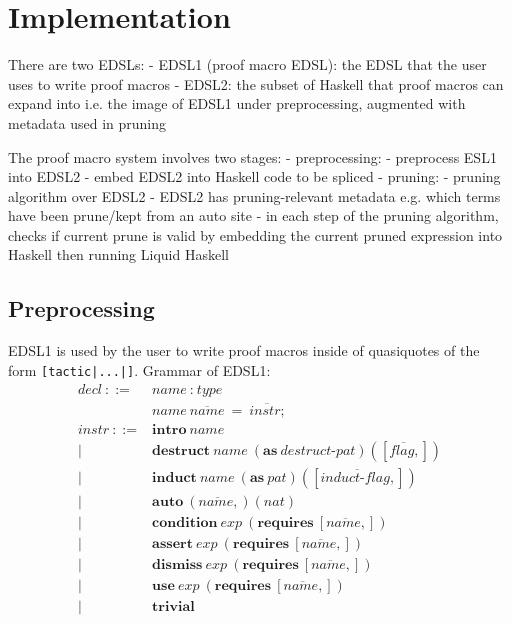 \section{Implementation}

There are two EDSLs:
- EDSL1 (proof macro EDSL): the EDSL that the user uses to write proof macros
- EDSL2: the subset of Haskell that proof macros can expand into i.e. the image of EDSL1 under preprocessing, augmented with metadata used in pruning

The proof macro system involves two stages:
- preprocessing:
  - preprocess ESL1 into EDSL2
  - embed EDSL2 into Haskell code to be spliced
- pruning:
  - pruning algorithm over EDSL2 
    - EDSL2 has pruning-relevant metadata e.g. which terms have been prune/kept from an auto site
    - in each step of the pruning algorithm, checks if current prune is valid by embedding the current pruned expression into Haskell then running Liquid Haskell

\subsection{Preprocessing}

EDSL1 is used by the user to write proof macros inside of quasiquotes of the form \texttt{[tactic|...|]}.
Grammar of EDSL1:
\begin{align*}
  \textit{decl}~ ::= &
    \textit{name} ~ : ~ \textit{type} \\ &
    \textit{name} ~ \overline{\textit{name}} ~ = ~ \overline{\textit{instr} ; }
  \\
  \textit{instr} ~ ::= &
    \textbf{intro} ~ \textit{name} \\ | &
    \textbf{destruct} ~ \textit{name} ~ (\textbf{as} ~ \textit{destruct-pat}) ([\overline{\textit{flag},}]) \\ | &
    \textbf{induct} ~ \textit{name} ~ (\textbf{as} ~ \textit{pat}) ([\overline{\textit{induct-flag},}]) \\ | &
    \textbf{auto} ~ (\overline{\textit{name},}) (\textit{nat}) \\ | &
    \textbf{condition} ~ \textit{exp} ~ (\textbf{requires} ~ [\overline{\textit{name},}]) \\ | &
    \textbf{assert} ~ \textit{exp} ~ (\textbf{requires} ~ [\overline{\textit{name},}]) \\ | &
    \textbf{dismiss} ~ \textit{exp} ~ (\textbf{requires} ~ [\overline{\textit{name},}]) \\ | &
    \textbf{use} ~ \textit{exp} ~ (\textbf{requires} ~ [\overline{\textit{name},}]) \\ | &
    \textbf{trivial}
\end{align*}


